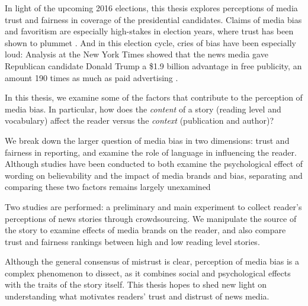 In light of the upcoming 2016 elections, this thesis explores perceptions of media trust and fairness in coverage of the presidential candidates. Claims of media bias and favoritism are especially high-stakes in election years, where trust has been shown to plummet \cite{Gallup-trust-2015}. And in this election cycle, cries of bias have been especially loud: Analysis at the New York Times showed that the news media gave Republican candidate Donald Trump a \$1.9 billion advantage in free publicity, an amount 190 times as much as paid advertising \cite{Trump-advantage}.

In this thesis, we examine some of the factors that contribute to the perception of media bias. In particular, how does the \emph{content} of a story (reading level and vocabulary) affect the reader versus the \emph{context} (publication and author)? 

We break down the larger question of media bias in two dimensions: trust and fairness in reporting, and examine the role of language in influencing the reader.  Although studies have been conducted to both examine the psychological effect of wording on believability and the impact of media brands and bias, separating and comparing these two factors remains largely unexamined \cite{weisberg2008seductive, baum2008eye}

Two studies are performed: a preliminary and main experiment to collect reader's perceptions of news stories through crowdsourcing. We manipulate the source of the story to examine effects of media brands on the reader, and also compare trust and fairness rankings between high and low reading level stories.

Although the general consensus of mistrust is clear, perception of media bias is a complex phenomenon to dissect, as it combines social and psychological effects with the traits of the story itself. This thesis hopes to shed new light on understanding what motivates readers' trust and distrust of news media.


 
 
